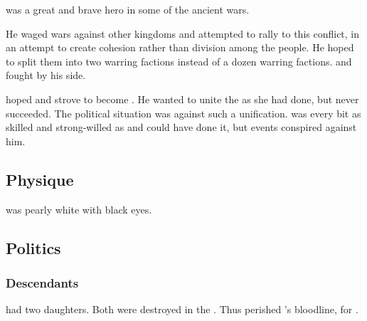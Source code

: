 \Nexagglachel{} was a great and brave hero in some of the ancient wars. 

He waged wars against other \draconian{} kingdoms and attempted to rally \dragons{} to this conflict, in an attempt to create cohesion rather than division among the \draconian{} people. He hoped to split them into two warring factions instead of a dozen warring factions. \Ishnaruchaefir{} and \Secherdamon{} fought by his side. 

\Nexagglachel{} hoped and strove to become . 
He wanted to unite the \dzraicchenosses{} as she had done, but never succeeded. 
The political situation was against such a unification. 
\Nexagglachel{} was every bit as skilled and strong-willed as \Kserasshana{} and could have done it, but events conspired against him. 









\subsection{Physique}
\Nexagglachel was pearly white with black eyes. 









\subsection{Politics}





\subsubsection{Descendants}
\Nexagglachel had two daughters.
Both were destroyed in the .
Thus perished 's bloodline, for . 














